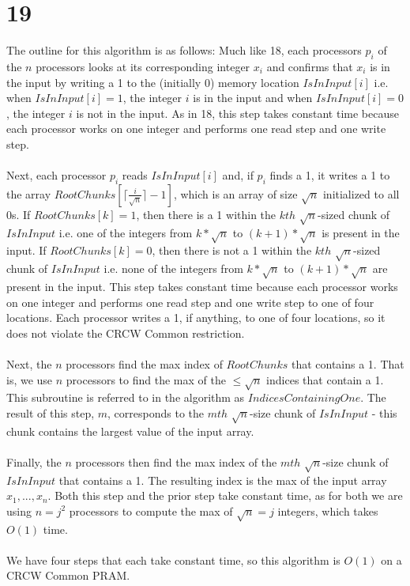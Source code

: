 \documentclass[letterpaper,notitlepage,twoside]{article}
\begin{document}
\section*{19}
The outline for this algorithm is as follows: Much like 18, each processors $p_i$ of the $n$ processors looks at its corresponding integer $x_i$ and confirms that $x_i$ is in the input by writing a 1 to the (initially 0) memory location $IsInInput[i]$ i.e. when $IsInInput[i] = 1$, the integer $i$ is in the input and when $IsInInput[i] = 0$, the integer $i$ is not in the input. As in 18, this step takes constant time because each processor works on one integer and performs one read step and one write step. \\\\
Next, each processor $p_i$ reads $IsInInput[i]$ and, if $p_i$ finds a 1, it writes a 1 to the array $RootChunks[\lceil \frac{i}{\sqrt{n}} \rceil -1]$, which is an array of size $\sqrt{n}$ initialized to all 0s. If $RootChunks[k] = 1$, then there is a 1 within the $kth$ $\sqrt{n}$-sized chunk of $IsInInput$ i.e. one of the integers from $k*\sqrt{n}$ to $(k+1)*\sqrt{n}$ is present in the input. If $RootChunks[k] = 0$, then there is not a 1 within the $kth$ $\sqrt{n}$-sized chunk of $IsInInput$ i.e. none of the integers from $k*\sqrt{n}$ to $(k+1)*\sqrt{n}$ are present in the input. This step takes constant time because each processor works on one integer and performs one read step and one write step to one of four locations. Each processor writes a 1, if anything, to one of four locations, so it does not violate the CRCW Common restriction. \\\\
Next, the $n$ processors find the max index of $RootChunks$ that contains a 1. That is, we use $n$ processors to find the max of the $\leq \sqrt{n}$ indices that contain a 1. This subroutine is referred to in the algorithm as $IndicesContainingOne$. The result of this step, $m$, corresponds to the $mth$ $\sqrt{n}$-size chunk of $IsInInput$ - this chunk contains the largest value of the input array. \\\\
Finally, the $n$ processors then find the max index of the $mth$ $\sqrt{n}$-size chunk of $IsInInput$ that contains a 1. The resulting index is the max of the input array $x_1, ..., x_n$. Both this step and the prior step take constant time, as for both we are using $n = j^{2}$ processors to compute the max of $\sqrt{n} = j$ integers, which takes $O(1)$ time. \\\\
We have four steps that each take constant time, so this algorithm is $O(1)$ on a CRCW Common PRAM.
\end{document}
